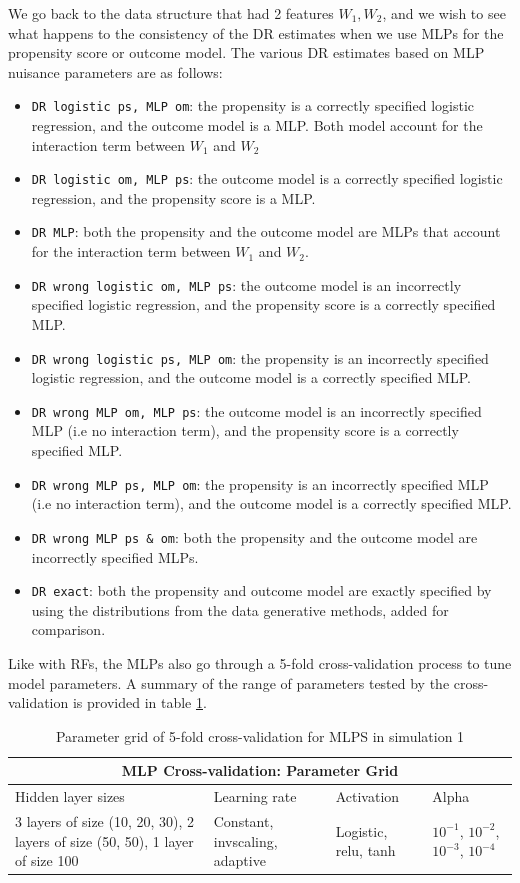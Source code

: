 \documentclass[12pt,twoside]{article}
\begin{document}
We go back to the data structure that had 2 features $W_1,W_2$, and we wish to see what happens to the consistency of the DR estimates when we use MLPs for the propensity score or outcome model. The various DR estimates based on MLP nuisance parameters are as follows: 
\begin{itemize}
    \item \texttt{DR logistic ps, MLP om}: the propensity is a correctly specified logistic regression, and the outcome model is a MLP. Both model account for the interaction term between $W_1$ and $W_2$
    \item \texttt{DR logistic om, MLP ps}: the outcome model is a correctly specified logistic regression, and the propensity score is a MLP.
    \item \texttt{DR MLP}: both the propensity and the outcome model are MLPs that account for the interaction term between $W_1$ and $W_2$.
    \item \texttt{DR wrong logistic om, MLP ps}: the outcome model is an incorrectly specified logistic regression, and the propensity score is a correctly specified MLP.
    \item \texttt{DR wrong logistic ps, MLP om}: the propensity is an incorrectly specified logistic regression, and the outcome model is a correctly specified MLP.
    \item \texttt{DR wrong MLP om, MLP ps}: the outcome model is an incorrectly specified MLP (i.e no interaction term), and the propensity score is a correctly specified MLP.
    \item \texttt{DR wrong MLP ps, MLP om}: the propensity is an incorrectly specified MLP (i.e no interaction term), and the outcome model is a correctly specified MLP.
    \item \texttt{DR wrong MLP ps \& om}: both the propensity and the outcome model are incorrectly specified MLPs.
    \item \texttt{DR exact}: both the propensity and outcome model are exactly specified by using the distributions from the data generative methods, added for comparison.
\end{itemize}

Like with RFs, the MLPs also go through a 5-fold cross-validation process to tune model parameters. A summary of the range of parameters tested by the cross-validation is provided in table \ref{tableMLP}.

\begin{table}[h!]
    \centering
\begin{tabular}{ |p{3cm}|p{3cm}|p{3cm}|p{3cm}| }
 \hline
 \multicolumn{4}{|c|}{MLP Cross-validation: Parameter Grid} \\
 \hline
 Hidden layer sizes & Learning rate & Activation & Alpha\\
 \hline
 3 layers of size (10, 20, 30), 2 layers of size (50, 50), 1 layer of size 100 & Constant, invscaling, adaptive & Logistic, relu, tanh & $10^{-1}$, $10^{-2}$, $10^{-3}$, $10^{-4}$ \\
 \hline 
\end{tabular}
\caption{Parameter grid of 5-fold cross-validation for MLPS in simulation 1}
\label{tableMLP}
\end{table}
\end{document}

